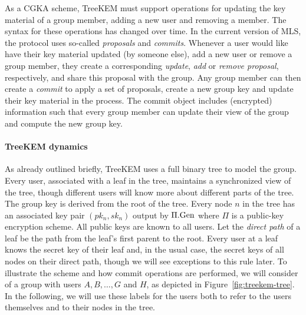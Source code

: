 As a CGKA scheme, TreeKEM must support operations for updating the key material of a group member, adding a new user and removing a member. The syntax for these operations has changed over time. In the current version of MLS, the protocol uses so-called \emph{proposals} and \emph{commits}. Whenever a user would like have their key material updated (by someone else), add a new user or remove a group member, they create a corresponding \emph{update}, \emph{add} or \emph{remove proposal}, respectively, and share this proposal with the group. Any group member can then create a \emph{commit} to apply a set of proposals, create a new group key and update their key material in the process. The commit object includes (encrypted) information such that every group member can update their view of the group and compute the new group key.

\paragraph{TreeKEM dynamics}

As already outlined briefly, TreeKEM uses a full binary tree to model the group. Every user, associated with a leaf in the tree, maintains a synchronized view of the tree, though different users will know more about different parts of the tree. The group key is derived from the root of the tree. Every node $n$ in the tree has an associated key pair $(pk_n, sk_n)$ output by $\Pi.\mathrm{Gen}$ where $\Pi$ is a public-key encryption scheme. All public keys are known to all users. Let the \emph{direct path} of a leaf be the path from the leaf's first parent to the root. Every user at a leaf knows the secret key of their leaf and, in the usual case, the secret keys of all nodes on their direct path, though we will see exceptions to this rule later. To illustrate the scheme and how commit operations are performed, we will consider of a group with users $A, B, \ldots, G$ and $H$, as depicted in Figure~\ref{fig:treekem-tree}. In the following, we will use these labels for the users both to refer to the users themselves and to their nodes in the tree.

